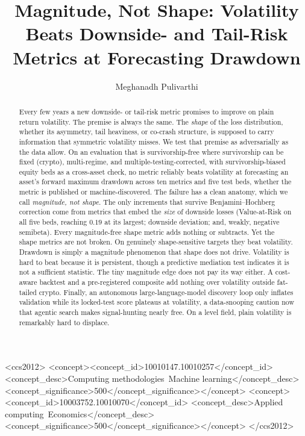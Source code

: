 \documentclass[sigconf,nonacm]{acmart}
\begin{document}
\title{Magnitude, Not Shape: Volatility Beats Downside- and Tail-Risk
Metrics at Forecasting Drawdown}

\author{Meghanadh Pulivarthi}
\renewcommand{\shortauthors}{Pulivarthi}

\begin{abstract}
Every few years a new downside- or tail-risk metric promises to improve on
plain return volatility. The premise is always the same. The \emph{shape} of the
loss distribution, whether its asymmetry, tail heaviness, or co-crash structure, is
supposed to carry information that symmetric volatility misses. We test that premise
as adversarially as the data allow. On an evaluation that is survivorship-free where
survivorship can be fixed (crypto), multi-regime, and multiple-testing-corrected, with
survivorship-biased equity beds as a cross-asset check, no metric reliably beats
volatility at forecasting an asset's forward maximum drawdown across ten metrics and five
test beds, whether the metric is published or machine-discovered. The failure has a clean
anatomy, which we call \emph{magnitude, not shape}. The only increments that survive
Benjamini--Hochberg correction come from metrics that embed the \emph{size} of downside
losses (Value-at-Risk on all five beds, reaching $0.19$ at its largest; downside deviation;
and, weakly, negative semibeta). Every magnitude-free shape metric adds nothing or
subtracts. Yet the shape metrics are not broken. On genuinely
shape-sensitive targets they beat volatility. Drawdown is simply a magnitude
phenomenon that shape does not drive. Volatility is
hard to beat because it is persistent, though a predictive mediation test indicates it is
not a sufficient statistic. The tiny magnitude edge does not pay its way either.
A cost-aware backtest and a pre-registered composite add nothing over volatility
outside fat-tailed crypto. Finally, an autonomous large-language-model discovery
loop only inflates validation while its locked-test score plateaus at volatility, a
data-snooping caution now that agentic search makes signal-hunting nearly free.
On a level field, plain volatility is remarkably hard to displace.
\end{abstract}

\begin{CCSXML}
<ccs2012>
<concept><concept_id>10010147.10010257</concept_id>
<concept_desc>Computing methodologies~Machine learning</concept_desc>
<concept_significance>500</concept_significance></concept>
<concept><concept_id>10003752.10010070</concept_id>
<concept_desc>Applied computing~Economics</concept_desc>
<concept_significance>500</concept_significance></concept>
</ccs2012>
\end{CCSXML}
\end{document}
